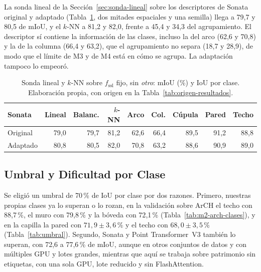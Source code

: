 La sonda lineal de la Sección~\ref{sec:sonda-lineal} sobre los descriptores de Sonata
original y adaptado (Tabla~\ref{tab:sonda}, dos mitades espaciales y una semilla) llega a 79{,}7 y 80{,}5 de mIoU, y el $k$-NN a 81{,}2 y 82{,}0, frente a 45{,}4 y
34{,}3 del agrupamiento. El descriptor sí contiene la información de las clases, incluso
la del arco (62{,}6 y 70{,}8) y la de la columna (66{,}4 y 63{,}2), que el agrupamiento no
separa (18{,}7 y 28{,}9), de modo que el límite de M3 y de M4 está en cómo se agrupa. La
adaptación tampoco lo empeoró.

\begin{table}[!htbp]
\centering
{}\small
\setlength{\tabcolsep}{3pt}
\caption[Sonda lineal sobre los descriptores de Sonata]{Sonda lineal y $k$-NN sobre $f_{\mathrm{ssl}}$ fijo, sin \emph{otro}: mIoU (\%) y IoU por clase. Elaboración propia, con origen en la Tabla~\ref{tab:origen-resultados}.}
\label{tab:sonda}
\begin{tabularx}{\linewidth}{@{}>{\raggedright\arraybackslash}Xrrrrrrrr@{}}
\toprule
\textbf{Sonata} & \textbf{Lineal} & \textbf{Balanc.} & \textbf{$k$-NN} & \textbf{Arco} & \textbf{Col.} & \textbf{Cúpula} & \textbf{Pared} & \textbf{Techo} \\
\midrule
Original & 79{,}0 & 79{,}7 & 81{,}2 & 62{,}6 & 66{,}4 & 89{,}5 & 91{,}2 & 88{,}8 \\
Adaptado & 80{,}8 & 80{,}5 & 82{,}0 & 70{,}8 & 63{,}2 & 88{,}6 & 90{,}9 & 89{,}0 \\
\bottomrule
\end{tabularx}
\end{table}

\FloatBarrier
\subsection[Umbral y Dificultad por Clase]{Umbral y Dificultad por Clase}
\label{sec:res-umbral}

Se eligió un umbral de 70\,\% de IoU por clase por dos razones. Primero, nuestras
propias clases ya lo superan o lo rozan, en la validación sobre ArCH el techo con
88{,}7\,\%, el muro con 79{,}8\,\% y la bóveda con 72{,}1\,\%
(Tabla~\ref{tab:m2-arch-clases}), y en la capilla la pared con $71{,}9\pm3{,}6$\,\% y el
techo con $68{,}0\pm3{,}5$\,\% (Tabla~\ref{tab:umbral}). Segundo, Sonata
\cite{wu2025sonata} y Point Transformer~V3 \cite{wu2024ptv3} también lo superan, con
72{,}6 a 77{,}6\,\% de mIoU, aunque en otros conjuntos de datos y con múltiples GPU y
lotes grandes, mientras que aquí se trabaja sobre patrimonio sin etiquetas, con una
sola GPU, lote reducido y sin FlashAttention.

